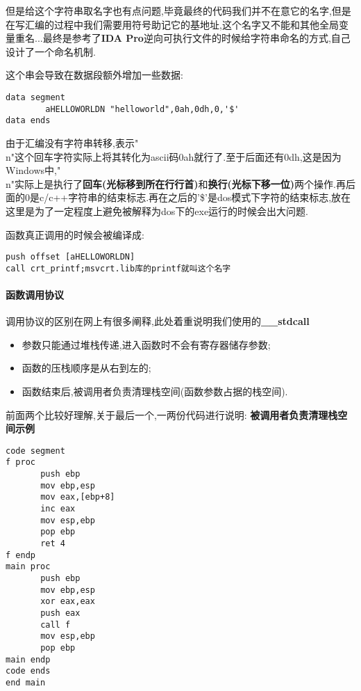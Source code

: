 \documentclass{article}
\begin{document}
但是给这个字符串取名字也有点问题,毕竟最终的代码我们并不在意它的名字,但是在写汇编的过程中我们需要用符号助记它的基地址,这个名字又不能和其他全局变量重名...最终是参考了\textbf{IDA Pro}逆向可执行文件的时候给字符串命名的方式,自己设计了一个命名机制.


这个串会导致在数据段额外增加一些数据:

\begin{verbatim}
data segment
        aHELLOWORLDN "helloworld",0ah,0dh,0,'$'
data ends
\end{verbatim}

由于汇编没有字符串转移,表示"\\n"这个回车字符实际上将其转化为ascii码0ah就行了.至于后面还有0dh,这是因为Windows中,"\\n"实际上是执行了\textbf{回车(光标移到所在行行首)}和\textbf{换行(光标下移一位)}两个操作.再后面的0是c/c++字符串的结束标志.再在之后的'\$'是dos模式下字符的结束标志,放在这里是为了一定程度上避免被解释为dos下的exe运行的时候会出大问题.


函数真正调用的时候会被编译成:

\begin{verbatim}
push offset [aHELLOWORLDN]
call crt_printf;msvcrt.lib库的printf就叫这个名字
\end{verbatim}


\paragraph{函数调用协议}

调用协议的区别在网上有很多阐释,此处着重说明我们使用的\textbf{\_\_stdcall}

\begin{itemize}
\item 参数只能通过堆栈传递,进入函数时不会有寄存器储存参数;
\item 函数的压栈顺序是从右到左的;
\item  函数结束后,被调用者负责清理栈空间(函数参数占据的栈空间).
\end{itemize}

前面两个比较好理解,关于最后一个,一两份代码进行说明:
\textbf{被调用者负责清理栈空间示例}

\begin{verbatim}
code segment
f proc
       push ebp
       mov ebp,esp 
       mov eax,[ebp+8]
       inc eax
       mov esp,ebp
       pop ebp
       ret 4
f endp
main proc
       push ebp
       mov ebp,esp
       xor eax,eax
       push eax
       call f
       mov esp,ebp
       pop ebp
main endp
code ends
end main
\end{verbatim}
\end{document}
